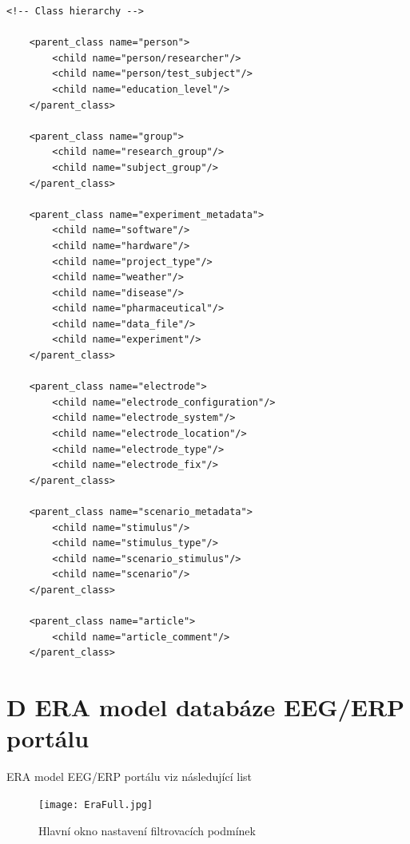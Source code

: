 \documentclass{projekt}
\begin{document}
\begin{verbatim}
<!-- Class hierarchy -->

    <parent_class name="person">
        <child name="person/researcher"/>
        <child name="person/test_subject"/>
        <child name="education_level"/>
    </parent_class>

    <parent_class name="group">
        <child name="research_group"/>
        <child name="subject_group"/>
    </parent_class>

    <parent_class name="experiment_metadata">
        <child name="software"/>
        <child name="hardware"/>
        <child name="project_type"/>
        <child name="weather"/>
        <child name="disease"/>
        <child name="pharmaceutical"/>
        <child name="data_file"/>
        <child name="experiment"/>
    </parent_class>

    <parent_class name="electrode">
        <child name="electrode_configuration"/>
        <child name="electrode_system"/>
        <child name="electrode_location"/>
        <child name="electrode_type"/>
        <child name="electrode_fix"/>
    </parent_class>

    <parent_class name="scenario_metadata">
        <child name="stimulus"/>
        <child name="stimulus_type"/>
        <child name="scenario_stimulus"/>
        <child name="scenario"/>
    </parent_class>

    <parent_class name="article">
        <child name="article_comment"/>
    </parent_class>

\end{verbatim}

\thispagestyle{plain}



\newpage
\thispagestyle{plain}
\section*{{\LARGE D} ERA model databáze EEG/ERP portálu}
\hspace{0.65cm}ERA model EEG/ERP portálu \cite{_31} viz následující list
\newpage

\begin{figure}[htb!]
\begin{center}
\texttt{[image: EraFull.jpg]}
\caption{Hlavní okno nastavení filtrovacích podmínek}
\end{center}
\end{figure}

\thispagestyle{plain}
\end{document}
